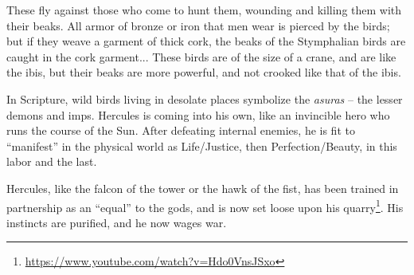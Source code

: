 \begin{quotex}
These fly against those who come to hunt them, wounding and killing them with their beaks. All armor of bronze or iron that men wear is pierced by the birds; but if they weave a garment of thick cork, the beaks of the Stymphalian birds are caught in the cork garment... These birds are of the size of a crane, and are like the ibis, but their beaks are more powerful, and not crooked like that of the ibis.
\end{quotex}


In Scripture, wild birds living in desolate places symbolize the \emph{asuras} -- the lesser demons and imps. Hercules is coming into his own, like an invincible hero who runs the course of the Sun. After defeating internal enemies, he is fit to ``manifest'' in the physical world as Life/Justice, then Perfection/Beauty, in this labor and the last.

Hercules, like the falcon of the tower or the hawk of the fist, has been trained in partnership as an ``equal'' to the gods, and is now set loose upon his quarry\footnote{\url{https://www.youtube.com/watch?v=Hdo0VnsJSxo}}. His instincts are purified, and he now wages war.



